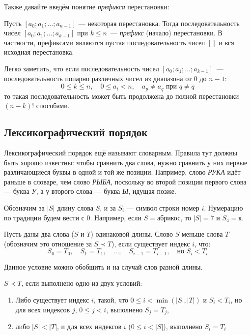 \documentclass[12pt,a4paper,oneside]{article}
\begin{document}
Также давайте введём понятие \emph{префикса} перестановки: 

\begin{definition}
Пусть $[a_0; a_1; \dots; a_{n-1}]$ --- некоторая перестановка.
Тогда последовательность чисел $[a_0; a_1; \dots; a_{k-1}]$ при $k \le n$~--- 
\emph{префикс} (начало) перестановки. В частности, префиксами
являются пустая последовательность чисел $[]$ и вся исходная перестановка.
\end{definition}

Легко заметить, что если последовательность чисел $[a_0; a_1; \dots; a_{k-1}]$~---
последовательность попарно различных чисел из диапазона от $0$ до $n-1$:
$$0 \le k \le n, \quad 0 \le a_i < n, \quad a_p \ne a_q \mbox{ при } q \ne q$$
то такая последовательность
может быть продолжена до полной перестановки $(n-k)!$ способами.

\subsection{Лексикографический порядок}

Лексикографический порядок ещё называют словарным. Правила тут должны быть
хорошо известны: чтобы сравнить два слова, нужно сравнить у них первые различающиеся 
буквы в одной и той же позиции. 
Например, слово \emph{РУКА} идёт раньше в словаре, чем слово \emph{РЫБА}, поскольку во второй
позиции первого слова --- буква \emph{У}, а у второго слова --- буква \emph{Ы}, идущая позже.

\begin{definition}
Обозначим за $|S|$ длину слова $S$, и за $S_i$ --- символ строки номер $i$. Нумерацию по
традиции будем вести с $0$.
Например, если $S = \texttt{абрикос}$, то $|S|=7$ и $S_4=\texttt{к}$.
\end{definition}

\begin{definition}
Пусть даны два слова ($S$ и $T$) одинаковой длины.
Слово $S$ меньше слова $T$ (обозначим это отношение за $S \prec T$), 
если существует индекс $i$, что:
$$S_0 = T_0, \quad S_1 = T_1, \quad \dots, \quad S_{i-1} = T_{i-1}, \quad \mbox{но } S_i < T_i$$
\end{definition}

\noindent Данное условие можно обобщить и на случай слов разной длины.
\begin{definition}
$S \prec T$, если выполнено одно из двух условий:
\begin{enumerate}
\item Либо существует индекс $i$, такой, что $0 \le i < \min(|S|,|T|)$ и $S_i < T_i$, но для всех индексов $j$, $0 \le j < i$, выполнено $S_j = T_j$,
\item либо $|S| < |T|$, и для всех индексов $i$ ($0 \le i < |S|$), выполнено $S_i=T_i$
\end{enumerate}
\end{definition}
\end{document}
